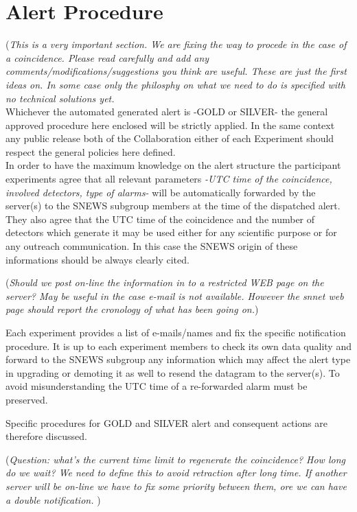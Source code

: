\documentclass{article}
\begin{document}
\section{Alert Procedure}
({\it This is a very important section. We are fixing the way to procede
in the case of a coincidence. Please read carefully and add any 
comments/modifications/suggestions you think are useful. These are 
just the first ideas on. In some case  only the philosphy on what we need 
to do is specified with no technical solutions yet.}\\

Whichever the automated generated alert is -GOLD or SILVER- the general 
approved procedure here enclosed will be strictly applied. 
In the same context any public 
release both of the Collaboration either of each Experiment should respect
the general policies here defined.\\ 
In order to have the maximum knowledge on the alert structure the participant experiments 
agree that all relevant parameters  {\it -UTC time of the coincidence, 
involved detectors, type of alarms-} will be automatically forwarded by the server(s) to the 
SNEWS subgroup members at the time of the dispatched alert. They also agree that the UTC
time of the coincidence and the number of detectors which generate it may be used either for any
scientific purpose or for any outreach communication. 
In this case the SNEWS origin of these informations should be always clearly cited.

({\it Should we post on-line the information in to a 
restricted WEB page on the server? May be useful in the case e-mail is not available. 
However the snnet web page should report the cronology of what has been going on.})

Each experiment provides a list of e-mails/names and fix the specific notification procedure. 
It is up to each experiment members to check its own data quality and forward
to the SNEWS subgroup any information which may affect the alert type 
in upgrading or demoting it as well to resend the datagram to the server(s).
To avoid misunderstanding the UTC time of a re-forwarded alarm must be 
preserved.
 
Specific procedures for GOLD and SILVER alert and consequent actions 
are therefore discussed.

({\it Question: what's the current time limit to regenerate the coincidence?
How long do we wait? We need to define this to avoid retraction after long 
time. If another server will be on-line we have to fix some priority between 
them, ore we can have a double notification.
})
\end{document}
